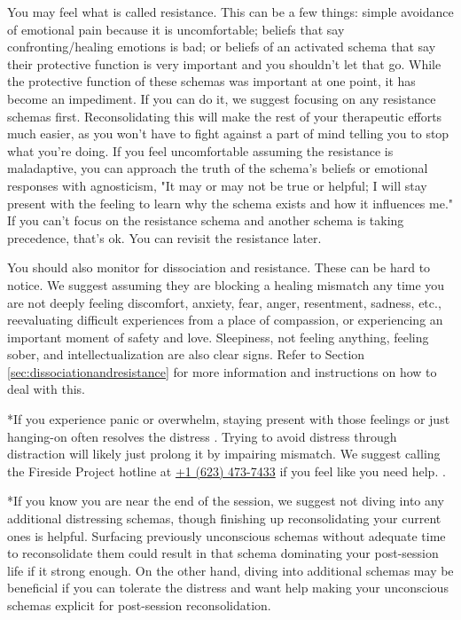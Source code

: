 \documentclass[12pt,letterpaper]{article}
\begin{document}
You may feel what is called resistance. This can be a few things: simple avoidance of emotional pain because it is uncomfortable; beliefs that say confronting/healing emotions is bad; or beliefs of an activated schema that say their protective function is very important and you shouldn't let that go. While the protective function of these schemas was important at one point, it has become an impediment. If you can do it, we suggest focusing on any resistance schemas first. Reconsolidating this will make the rest of your therapeutic efforts much easier, as you won't have to fight against a part of mind telling you to stop what you're doing. If you feel uncomfortable assuming the resistance is maladaptive, you can approach the truth of the schema's beliefs or emotional responses with agnosticism, "It may or may not be true or helpful; I will stay present with the feeling to learn why the schema exists and how it influences me." If you can't focus on the resistance schema and another schema is taking precedence, that's ok. You can revisit the resistance later.

You should also monitor for dissociation and resistance. These can be hard to notice. We suggest assuming they are blocking a healing mismatch any time you are not deeply feeling discomfort, anxiety, fear, anger, resentment, sadness, etc., reevaluating difficult experiences from a place of compassion, or experiencing an important moment of safety and love. Sleepiness, not feeling anything, feeling sober, and intellectualization are also clear signs. Refer to Section \ref{sec:dissociationandresistance} for more information and instructions on how to deal with this.

*If you experience panic or overwhelm, staying present with those feelings or just hanging-on often resolves the distress \cite{mithoeferManual}. Trying to avoid distress through distraction will likely just prolong it by impairing mismatch. We suggest calling the Fireside Project hotline at \href{tel:1-623-473-7433}{+1 (623) 473-7433} if you feel like you need help. \cite{firesideProject}. 

*If you know you are near the end of the session, we suggest not diving into any additional distressing schemas, though finishing up reconsolidating your current ones is helpful. Surfacing previously unconscious schemas without adequate time to reconsolidate them could result in that schema dominating your post-session life if it strong enough. On the other hand, diving into additional schemas may be beneficial if you can tolerate the distress and want help making your unconscious schemas explicit for post-session reconsolidation.
\end{document}
